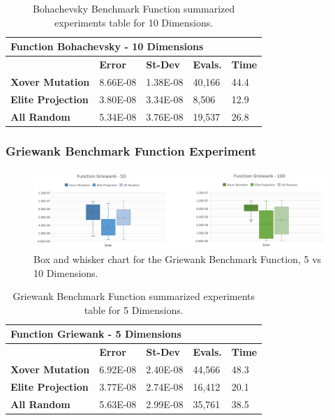 \documentclass[graybox]{svmult}
\begin{document}
\begin{table}[]
    \scriptsize
    \centering
    \caption{Bohachevsky Benchmark Function summarized experiments table for 10 Dimensions.}\label{tab.fun_bohachevsky10}
    \begin{tabular}{@{}lllll@{}}
    \toprule
    \multicolumn{5}{l}{\textbf{Function Bohachevsky - 10   Dimensions}} \\ \midrule
     & \textbf{Error} & \textbf{St-Dev} & \textbf{Evals.} & \textbf{Time} \\
    \textbf{Xover Mutation} & 8.66E-08 & 1.38E-08 & 40,166 & 44.4 \\
    \textbf{Elite Projection} & 3.80E-08 & 3.34E-08 & 8,506 & 12.9 \\
    \textbf{All Random} & 5.34E-08 & 3.76E-08 & 19,537 & 26.8 \\ \bottomrule
    \end{tabular}
    \end{table}


\subsubsection{Griewank Benchmark Function Experiment}

\begin{figure}
    \includegraphics[width=\textwidth]{img/fig_fun_griewank.pdf}
    \caption{Box and whisker chart for the Griewank Benchmark Function, 5 vs 10 Dimensions.} \label{fig.fun_griewank}
    \end{figure}

\begin{table}[]
    \scriptsize
    \centering
    \caption{Griewank Benchmark Function summarized experiments table for 5 Dimensions.}\label{tab.fun_griewank5}
    \begin{tabular}{@{}lllll@{}}
    \toprule
    \multicolumn{5}{l}{\textbf{Function Griewank - 5 Dimensions}} \\ \midrule
     & \textbf{Error} & \textbf{St-Dev} & \textbf{Evals.} & \textbf{Time} \\
    \textbf{Xover Mutation} & 6.92E-08 & 2.40E-08 & 44,566 & 48.3 \\
    \textbf{Elite Projection} & 3.77E-08 & 2.74E-08 & 16,412 & 20.1 \\
    \textbf{All Random} & 5.63E-08 & 2.99E-08 & 35,761 & 38.5 \\ \bottomrule
    \end{tabular}
    \end{table}
\end{document}
